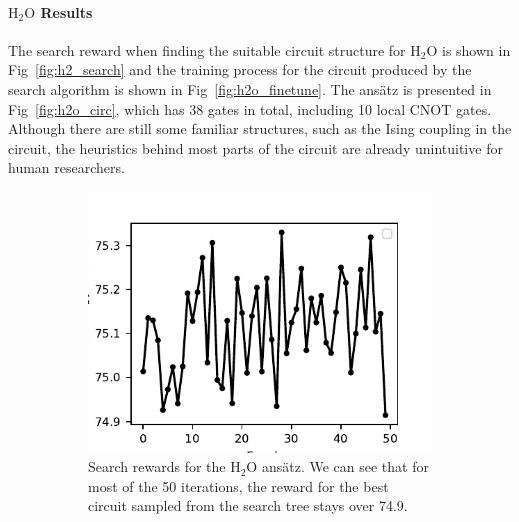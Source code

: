 \documentclass[a4paper,onecolumn,11pt]{quantumarticle}
\begin{document}
\paragraph{$\text{H}_2\text{O}$ Results} The search reward when finding the suitable circuit structure for $\text{H}_2\text{O}$ is shown in Fig~\ref{fig:h2_search} and the training process for the circuit produced by the search algorithm is shown in Fig~\ref{fig:h2o_finetune}. The ans\"atz is presented in Fig~\ref{fig:h2o_circ}, which has 38 gates in total, including 10 local CNOT gates. Although there are still some familiar structures, such as the Ising coupling in the circuit, the heuristics behind most parts of the circuit are already unintuitive for human researchers.
\begin{figure}[H]
    \centering
    \begin{subfigure}[t]{0.48\linewidth}
        \includegraphics[width=\linewidth]{Figures/fig_H2O_search_rewards.pdf}
        \caption{Search rewards for the $\text{H}_2\text{O}$ ans\"atz. We can see that for most of the 50 iterations, the reward for the best circuit sampled from the search tree stays over 74.9.}
        \label{fig:h2o_search}
    \end{subfigure}
    ~ %
    \begin{subfigure}[t]{0.48\linewidth}

\end{subfigure}
\end{figure}
\end{document}
